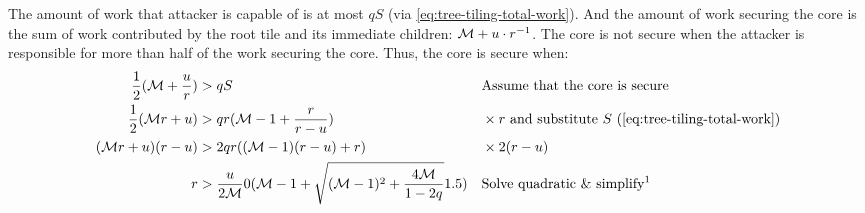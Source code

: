 The amount of work that attacker is capable of is at most $qS$ (via \autoref{eq:tree-tiling-total-work}).
And the amount of work securing the core is the sum of work contributed by the root tile and its immediate children: $\mathcal{M} + u\cdot r^{-1}$.
The core is not secure when the attacker is responsible for more than half of the work securing the core.
Thus, the core is secure when:
\begin{align}
    \frac12 (\Mroot  + \frac{u}r) &> qS && \text{Assume that the core is secure}
    \nonumber \\
    \frac12 (\Mroot r + u) &> qr(\Mroot -1+\frac{r}{r-u}) && \times r \text{ and substitute } S \text{ (\autoref{eq:tree-tiling-total-work})}
    \nonumber \\
    (\Mroot r + u)(r-u) &> 2qr((\Mroot -1)(r-u)+r) && \times 2(r-u)
    \label{eq:tree-tiling-safe-r-nofrac}
    \\
    r &> \frac{u}{2\Mroot}\left( \Mroot - 1 + \sqrt{(\Mroot - 1)^2 + \frac{4\Mroot}{1-2q}} \right) && \text{Solve quadratic \& simplify\footnotemark}
    \label{eq:tree-tiling-safe-r}
\end{align}

